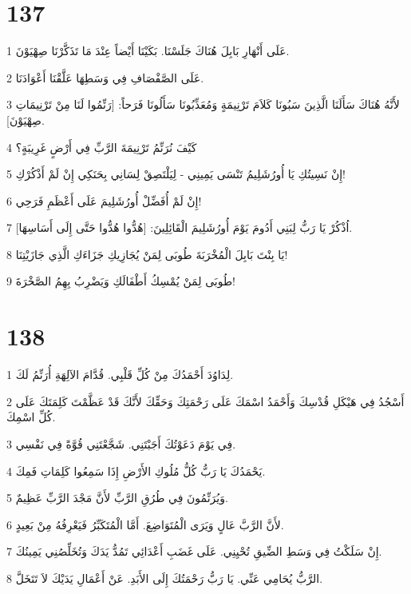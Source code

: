 \chapter{137}

\par 1 عَلَى أَنْهَارِ بَابِلَ هُنَاكَ جَلَسْنَا. بَكَيْنَا أَيْضاً عِنْدَ مَا تَذَكَّرْنَا صِهْيَوْنَ.
\par 2 عَلَى الصَّفْصَافِ فِي وَسَطِهَا عَلَّقْنَا أَعْوَادَنَا.
\par 3 لأَنَّهُ هُنَاكَ سَأَلَنَا الَّذِينَ سَبُونَا كَلاَمَ تَرْنِيمَةٍ وَمُعَذِّبُونَا سَأَلُونَا فَرَحاً: [رَنِّمُوا لَنَا مِنْ تَرْنِيمَاتِ صِهْيَوْنَ].
\par 4 كَيْفَ نُرَنِّمُ تَرْنِيمَةَ الرَّبِّ فِي أَرْضٍ غَرِيبَةٍ؟
\par 5 إِنْ نَسِيتُكِ يَا أُورُشَلِيمُ تَنْسَى يَمِينِي - لِيَلْتَصِقْ لِسَانِي بِحَنَكِي إِنْ لَمْ أَذْكُرْكِ!
\par 6 إِنْ لَمْ أُفَضِّلْ أُورُشَلِيمَ عَلَى أَعْظَمِ فَرَحِي!
\par 7 اُذْكُرْ يَا رَبُّ لِبَنِي أَدُومَ يَوْمَ أُورُشَلِيمَ الْقَائِلِينَ: [هُدُّوا هُدُّوا حَتَّى إِلَى أَسَاسِهَا].
\par 8 يَا بِنْتَ بَابِلَ الْمُخْرَبَةَ طُوبَى لِمَنْ يُجَازِيكِ جَزَاءَكِ الَّذِي جَازَيْتِنَا!
\par 9 طُوبَى لِمَنْ يُمْسِكُ أَطْفَالَكِ وَيَضْرِبُ بِهِمُ الصَّخْرَةَ!

\chapter{138}

\par 1 لِدَاوُدَ أَحْمَدُكَ مِنْ كُلِّ قَلْبِي. قُدَّامَ الآلِهَةِ أُرَنِّمُ لَكَ.
\par 2 أَسْجُدُ فِي هَيْكَلِ قُدْسِكَ وَأَحْمَدُ اسْمَكَ عَلَى رَحْمَتِكَ وَحَقِّكَ لأَنَّكَ قَدْ عَظَّمْتَ كَلِمَتَكَ عَلَى كُلِّ اسْمِكَ.
\par 3 فِي يَوْمَ دَعَوْتُكَ أَجَبْتَنِي. شَجَّعْتَنِي قُوَّةً فِي نَفْسِي.
\par 4 يَحْمَدُكَ يَا رَبُّ كُلُّ مُلُوكِ الأَرْضِ إِذَا سَمِعُوا كَلِمَاتِ فَمِكَ.
\par 5 وَيُرَنِّمُونَ فِي طُرُقِ الرَّبِّ لأَنَّ مَجْدَ الرَّبِّ عَظِيمٌ.
\par 6 لأَنَّ الرَّبَّ عَالٍ وَيَرَى الْمُتَوَاضِعَ. أَمَّا الْمُتَكَبِّرُ فَيَعْرِفُهُ مِنْ بَعِيدٍ.
\par 7 إِنْ سَلَكْتُ فِي وَسَطِ الضِّيقِ تُحْيِنِي. عَلَى غَضَبِ أَعْدَائِي تَمُدُّ يَدَكَ وَتُخَلِّصُنِي يَمِينُكَ.
\par 8 الرَّبُّ يُحَامِي عَنِّي. يَا رَبُّ رَحْمَتُكَ إِلَى الأَبَدِ. عَنْ أَعْمَالِ يَدَيْكَ لاَ تَتَخَلَّ.


